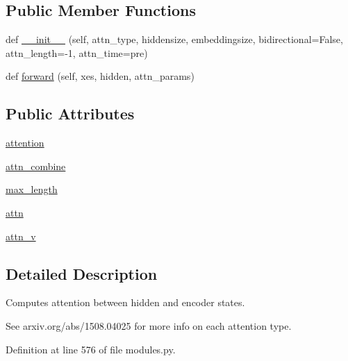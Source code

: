 \subsection*{Public Member Functions}
\begin{DoxyCompactItemize}
\item 
def \hyperlink{classparlai_1_1agents_1_1seq2seq_1_1modules_1_1AttentionLayer_aca18372fe25dbf5132ebcb2e63de31e3}{\+\_\+\+\_\+init\+\_\+\+\_\+} (self, attn\+\_\+type, hiddensize, embeddingsize, bidirectional=False, attn\+\_\+length=-\/1, attn\+\_\+time=\textquotesingle{}pre\textquotesingle{})
\item 
def \hyperlink{classparlai_1_1agents_1_1seq2seq_1_1modules_1_1AttentionLayer_a1c840562c4d3d0a715b4d5ddb1b8bafe}{forward} (self, xes, hidden, attn\+\_\+params)
\end{DoxyCompactItemize}
\subsection*{Public Attributes}
\begin{DoxyCompactItemize}
\item 
\hyperlink{classparlai_1_1agents_1_1seq2seq_1_1modules_1_1AttentionLayer_a8582ed1bb09a75d9a54e812a1b4ae648}{attention}
\item 
\hyperlink{classparlai_1_1agents_1_1seq2seq_1_1modules_1_1AttentionLayer_a38e130fe29ef52f03f78ba3c9a2ce4b9}{attn\+\_\+combine}
\item 
\hyperlink{classparlai_1_1agents_1_1seq2seq_1_1modules_1_1AttentionLayer_ac886c3ee00cb9163fed352af8aa53e0c}{max\+\_\+length}
\item 
\hyperlink{classparlai_1_1agents_1_1seq2seq_1_1modules_1_1AttentionLayer_a5bbb3d93ee56f0a41562141beb302da7}{attn}
\item 
\hyperlink{classparlai_1_1agents_1_1seq2seq_1_1modules_1_1AttentionLayer_a2b5f04f72da768b45739b7e9f1dd6705}{attn\+\_\+v}
\end{DoxyCompactItemize}


\subsection{Detailed Description}
\begin{DoxyVerb}Computes attention between hidden and encoder states.

See arxiv.org/abs/1508.04025 for more info on each attention type.
\end{DoxyVerb}
 

Definition at line 576 of file modules.\+py.



